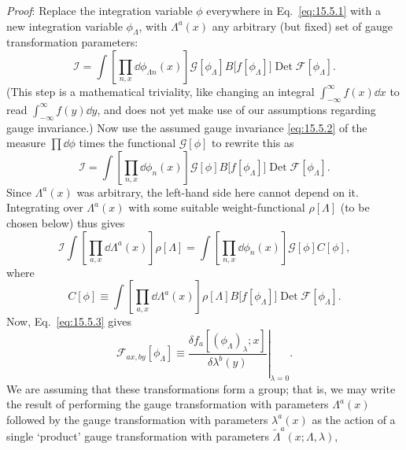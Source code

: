 \emph{Proof}: Replace the integration variable $\phi$ everywhere in
Eq.~\eqref{eq:15.5.1} with a new integration variable $\phi_\Lambda$, with
$\Lambda^a(x)$ any arbitrary (but fixed) set of gauge transformation
parameters:
\begin{equation}
  \mathcal I=\int\left[\prod_{n,x}\dd\phi_{\Lambda n}(x)\right]
  \mathcal G[\phi_\Lambda]B\bigl[f[\phi_\Lambda]\bigr]
  \operatorname{Det}\mathcal F[\phi_\Lambda].
  \tag{15.5.8}\label{eq:15.5.8}
\end{equation}
(This step is a mathematical triviality, like changing an integral
$\int_{-\infty}^{\infty}f(x)\dd x$ to read
$\int_{-\infty}^{\infty}f(y)\dd y$, and does not yet make use of our assumptions
regarding gauge invariance.) Now use the assumed gauge invariance
\eqref{eq:15.5.2} of the measure $\prod \dd\phi$ times the functional
$\mathcal G[\phi]$ to rewrite this as
\begin{equation}
  \mathcal I=\int\left[\prod_{n,x}\dd\phi_n(x)\right]
  \mathcal G[\phi]B\bigl[f[\phi_\Lambda]\bigr]
  \operatorname{Det}\mathcal F[\phi_\Lambda].
  \tag{15.5.9}\label{eq:15.5.9}
\end{equation}
Since $\Lambda^a(x)$ was arbitrary, the left-hand side here cannot depend
on it. Integrating over $\Lambda^a(x)$ with some suitable
weight-functional $\rho[\Lambda]$ (to be chosen below) thus gives
\begin{equation}
  \mathcal I\int\left[\prod_{a,x}\dd\Lambda^a(x)\right]\rho[\Lambda]
  =\int\left[\prod_{n,x}\dd\phi_n(x)\right]\mathcal G[\phi]C[\phi],
  \tag{15.5.10}\label{eq:15.5.10}
\end{equation}
where
\begin{equation}
  C[\phi]\equiv\int\left[\prod_{a,x}\dd\Lambda^a(x)\right]
  \rho[\Lambda]B\bigl[f[\phi_\Lambda]\bigr]
  \operatorname{Det}\mathcal F[\phi_\Lambda].
  \tag{15.5.11}\label{eq:15.5.11}
\end{equation}
Now, Eq.~\eqref{eq:15.5.3} gives
\begin{equation}
  \mathcal F_{a x,b y}[\phi_\Lambda]
  \equiv\left.\frac{\delta f_a[(\phi_\Lambda)_\lambda;x]}
  {\delta\lambda^b(y)}\right|_{\lambda=0}.
  \tag{15.5.12}\label{eq:15.5.12}
\end{equation}
We are assuming that these transformations form a group; that is, we may
write the result of performing the gauge transformation with parameters
$\Lambda^a(x)$ followed by the gauge transformation with parameters
$\lambda^a(x)$ as the action of a single `product' gauge transformation
with parameters $\widetilde\Lambda^a(x;\Lambda,\lambda)$,
